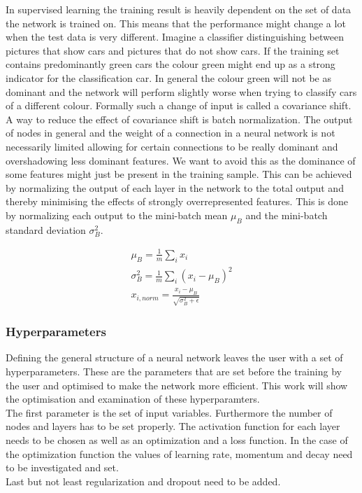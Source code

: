 In supervised learning the training result is heavily dependent on the set of data the network is trained on. This means that the performance might change a lot when the test data is very different. Imagine a classifier distinguishing between pictures that show cars and pictures that do not show cars. If the training set contains predominantly green cars the colour green might end up as a strong indicator for  the classification car. In general the colour green will not be as dominant and the network will perform slightly worse when trying to classify cars of a different colour. Formally such a change of input is called a covariance shift.\\
A way to reduce the effect of covariance shift is batch normalization. The output of nodes in general and the weight of a connection in a neural network is not necessarily limited allowing for certain connections to be really dominant and overshadowing less dominant features. We want to avoid this as the dominance of some features might just be present in the training sample. This can be achieved by normalizing the output of each layer in the network to the total output and thereby minimising the effects of strongly overrepresented features. This is done by normalizing each output to the mini-batch mean $\mu_B$ and the mini-batch standard deviation $\sigma_B^2$.

\begin{align}
    \mu_B = \frac{1}{m} \sum_i x_i\\
    \sigma_B^2 = \frac{1}{m} \sum_i (x_i - \mu_B)^2\\
    x_{i,norm} = \frac{x_i - \mu_B}{\sqrt{\sigma_B^2 + \epsilon}}
\end{align}

\subsubsection{Hyperparameters}

Defining the general structure of a neural network leaves the user with a set of hyperparameters. These are the parameters that are set before the training by the user and optimised to make the network more efficient. This work will show the optimisation and examination of these hyperparamters.\\
The first parameter is the set of input variables. Furthermore the number of nodes and layers has to be set properly. The activation function for each layer needs to be chosen as well as an optimization and a loss function. In the case of the optimization function the values of learning rate, momentum and decay need to be investigated and set.\\
Last but not least regularization and dropout need to be added.



